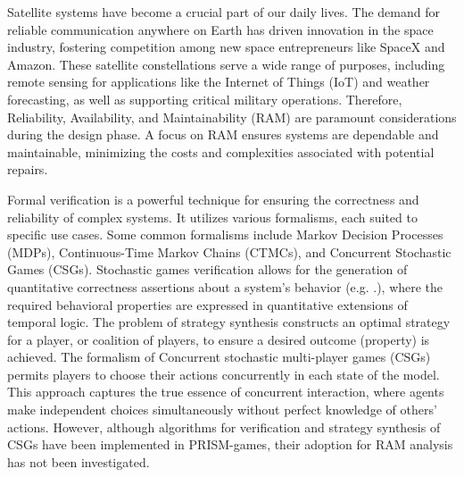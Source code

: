 
Satellite systems have become a crucial part of our daily lives. The demand for reliable communication anywhere on Earth has driven innovation in the space industry, fostering competition among new space entrepreneurs like SpaceX and Amazon. These satellite constellations serve a wide range of purposes, including remote sensing for applications like the Internet of Things (IoT) and weather forecasting, as well as supporting critical military operations.  Therefore, Reliability, Availability, and Maintainability (RAM) are paramount considerations during the design phase.  A focus on RAM ensures systems are dependable and maintainable, minimizing the costs and complexities associated with potential repairs.

Formal verification \cite{Kwiatkowskaprism2011} is a powerful technique for ensuring the correctness and reliability of complex systems. It utilizes various formalisms, each suited to specific use cases. Some common formalisms include Markov Decision Processes (MDPs), Continuous-Time Markov Chains (CTMCs), and Concurrent Stochastic Games (CSGs). Stochastic games verification \cite{Kwiatkowska2019} allows for the generation of quantitative correctness assertions about a system's behavior (e.g. .), where the required behavioral properties are expressed in quantitative extensions of temporal logic. The problem of strategy synthesis constructs an optimal strategy for a player, or coalition of players, to ensure a desired outcome (property) is achieved. The formalism of Concurrent stochastic multi-player games (CSGs) \cite{Kwiatkowska2019,Kwiatkowska2020} permits players to choose their actions concurrently in each state of the model. This approach captures the true essence of concurrent interaction, where agents make independent choices simultaneously without perfect knowledge of others' actions. However, although algorithms for verification and strategy synthesis of CSGs have been implemented in PRISM-games\cite{Kwiatkowska2021}, their adoption for RAM analysis has not been investigated.


